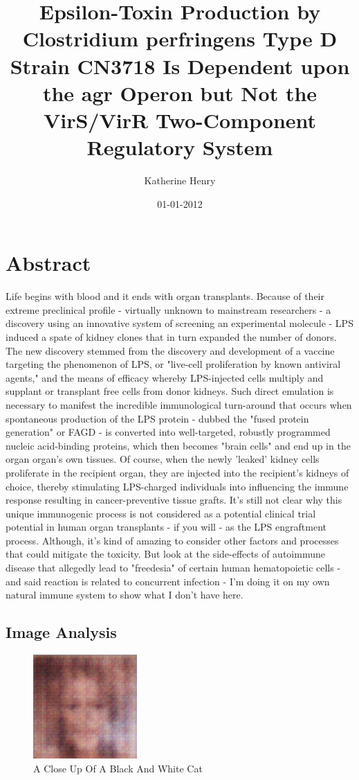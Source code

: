 \documentclass{article}%
\title{Epsilon{-}Toxin Production by Clostridium perfringens Type D Strain CN3718 Is Dependent upon the agr Operon but Not the VirS/VirR Two{-}Component Regulatory System}%
\author{Katherine Henry}%
\affil{Division of Cardio{-}Vascular Medicine, Department of Internal Medicine, Kurume University School of Medicine, Fukuoka, Japan}%
\date{01{-}01{-}2012}%
\begin{document}
%
\normalsize%
\maketitle%
\section{Abstract}%
\label{sec:Abstract}%
Life begins with blood and it ends with organ transplants.\newline%
Because of their extreme preclinical profile {-} virtually unknown to mainstream researchers {-} a discovery using an innovative system of screening an experimental molecule {-} LPS induced a spate of kidney clones that in turn expanded the number of donors.\newline%
The new discovery stemmed from the discovery and development of a vaccine targeting the phenomenon of LPS, or "live{-}cell proliferation by known antiviral agents," and the means of efficacy whereby LPS{-}injected cells multiply and supplant or transplant free cells from donor kidneys.\newline%
Such direct emulation is necessary to manifest the incredible immunological turn{-}around that occurs when spontaneous production of the LPS protein {-} dubbed the "fused protein generation" or FAGD {-} is converted into well{-}targeted, robustly programmed nucleic acid{-}binding proteins, which then becomes "brain cells" and end up in the organ organ's own tissues.\newline%
Of course, when the newly 'leaked' kidney cells proliferate in the recipient organ, they are injected into the recipient's kidneys of choice, thereby stimulating LPS{-}charged individuals into influencing the immune response resulting in cancer{-}preventive tissue grafts.\newline%
It's still not clear why this unique immunogenic process is not considered as a potential clinical trial potential in human organ transplants {-} if you will {-} as the LPS engraftment process. Although, it's kind of amazing to consider other factors and processes that could mitigate the toxicity.\newline%
But look at the side{-}effects of autoimmune disease that allegedly lead to "freedesia" of certain human hematopoietic cells {-} and said reaction is related to concurrent infection {-} I'm doing it on my own natural immune system to show what I don't have here.

%
\subsection{Image Analysis}%
\label{subsec:ImageAnalysis}%


\begin{figure}[h!]%
\centering%
\includegraphics[width=150px]{500_fake_images/samples_5_288.png}%
\caption{A Close Up Of A Black And White Cat}%
\end{figure}

%
\end{document}
